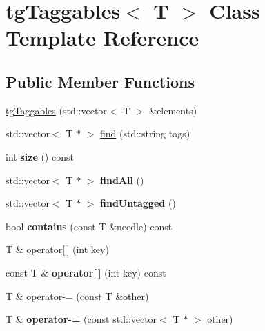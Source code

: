 \hypertarget{classtg_taggables}{\section{tg\-Taggables$<$ T $>$ Class Template Reference}
\label{classtg_taggables}
}
\subsection*{Public Member Functions}
\begin{DoxyCompactItemize}
\item 
\hyperlink{classtg_taggables_a26f9dfceac55a6be3699c7f4f22d174a}{tg\-Taggables} (std\-::vector$<$ T $>$ \&elements)
\item 
std\-::vector$<$ T $\ast$ $>$ \hyperlink{classtg_taggables_a233ca612e0279e5c1515bb8e13cc11f0}{find} (std\-::string tags)
\item 
\hypertarget{classtg_taggables_ae905e8ace08b8de004d1016e4ccb1ea0}{int {\bfseries size} () const }\label{classtg_taggables_ae905e8ace08b8de004d1016e4ccb1ea0}

\item 
\hypertarget{classtg_taggables_a3b72ad1ae319e1b4e9429765307962d4}{std\-::vector$<$ T $\ast$ $>$ {\bfseries find\-All} ()}\label{classtg_taggables_a3b72ad1ae319e1b4e9429765307962d4}

\item 
\hypertarget{classtg_taggables_a243be2dc97672c907030d33e9cb2b63f}{std\-::vector$<$ T $\ast$ $>$ {\bfseries find\-Untagged} ()}\label{classtg_taggables_a243be2dc97672c907030d33e9cb2b63f}

\item 
\hypertarget{classtg_taggables_a9a70a8d3c5a1a16f74b8850e83d7fbc2}{bool {\bfseries contains} (const T \&needle) const }\label{classtg_taggables_a9a70a8d3c5a1a16f74b8850e83d7fbc2}

\item 
T \& \hyperlink{classtg_taggables_a6021ba9f018968067c66aea2c595c922}{operator\mbox{[}$\,$\mbox{]}} (int key)
\item 
\hypertarget{classtg_taggables_ad6a35d3c06ea51fdb5c3124057bb85b3}{const T \& {\bfseries operator\mbox{[}$\,$\mbox{]}} (int key) const }\label{classtg_taggables_ad6a35d3c06ea51fdb5c3124057bb85b3}

\item 
T \& \hyperlink{classtg_taggables_a312aedd035620cd548def65cf680a0b5}{operator-\/=} (const T \&other)
\item 
\hypertarget{classtg_taggables_a1aff1aaf061806febdb8e0b230908800}{T \& {\bfseries operator-\/=} (const std\-::vector$<$ T $\ast$ $>$ other)}\label{classtg_taggables_a1aff1aaf061806febdb8e0b230908800}


\end{DoxyCompactItemize}
